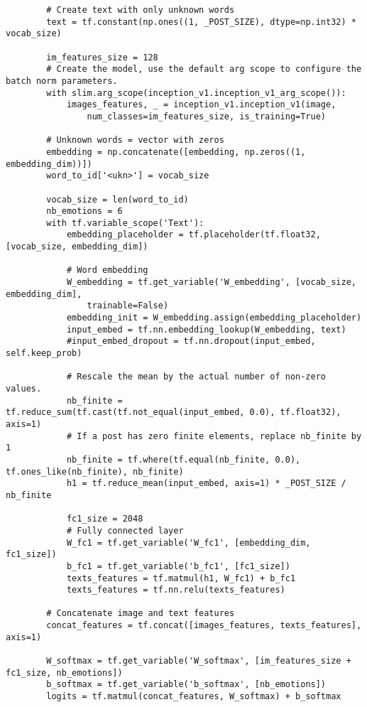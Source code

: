 \begin{lstlisting}
        # Create text with only unknown words
        text = tf.constant(np.ones((1, _POST_SIZE), dtype=np.int32) * vocab_size)

        im_features_size = 128
        # Create the model, use the default arg scope to configure the batch norm parameters.
        with slim.arg_scope(inception_v1.inception_v1_arg_scope()):
            images_features, _ = inception_v1.inception_v1(image, 
                num_classes=im_features_size, is_training=True)

        # Unknown words = vector with zeros
        embedding = np.concatenate([embedding, np.zeros((1, embedding_dim))])
        word_to_id['<ukn>'] = vocab_size

        vocab_size = len(word_to_id)
        nb_emotions = 6
        with tf.variable_scope('Text'):
            embedding_placeholder = tf.placeholder(tf.float32, [vocab_size, embedding_dim])
        
            # Word embedding
            W_embedding = tf.get_variable('W_embedding', [vocab_size, embedding_dim], 
                trainable=False)
            embedding_init = W_embedding.assign(embedding_placeholder)
            input_embed = tf.nn.embedding_lookup(W_embedding, text)
            #input_embed_dropout = tf.nn.dropout(input_embed, self.keep_prob)

            # Rescale the mean by the actual number of non-zero values.
            nb_finite = tf.reduce_sum(tf.cast(tf.not_equal(input_embed, 0.0), tf.float32), axis=1)
            # If a post has zero finite elements, replace nb_finite by 1
            nb_finite = tf.where(tf.equal(nb_finite, 0.0), tf.ones_like(nb_finite), nb_finite)
            h1 = tf.reduce_mean(input_embed, axis=1) * _POST_SIZE / nb_finite

            fc1_size = 2048
            # Fully connected layer
            W_fc1 = tf.get_variable('W_fc1', [embedding_dim, fc1_size])
            b_fc1 = tf.get_variable('b_fc1', [fc1_size])
            texts_features = tf.matmul(h1, W_fc1) + b_fc1
            texts_features = tf.nn.relu(texts_features)

        # Concatenate image and text features
        concat_features = tf.concat([images_features, texts_features], axis=1)

        W_softmax = tf.get_variable('W_softmax', [im_features_size + fc1_size, nb_emotions])
        b_softmax = tf.get_variable('b_softmax', [nb_emotions])
        logits = tf.matmul(concat_features, W_softmax) + b_softmax


\end{lstlisting}
